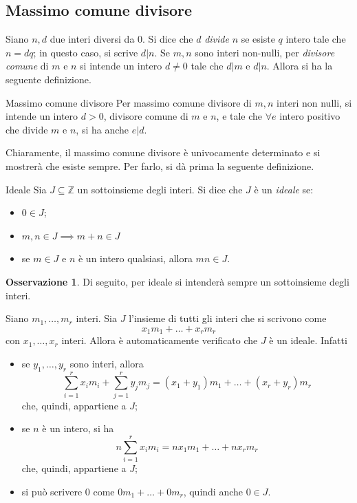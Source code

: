 \documentclass[11pt, a4paper]{scrartcl}
\theoremstyle{definition}
\numberwithin{esempio}{section}
\theoremstyle{definition}
\newtheorem{obs}{Osservazione}
\numberwithin{obs}{section}
\numberwithin{nota}{section}
\numberwithin{equation}{subsection}
\begin{document}
\subsection{Massimo comune divisore}
Siano $n, d$ due interi diversi da $0$.
Si dice che $d$ \textit{divide} $n$ se esiste $q$ intero tale che $n = dq$; in questo caso, si scrive $d|n$.
Se $m,n$ sono interi non-nulli, per \textit{divisore comune} di $m$ e $n$ si intende un intero $d\neq 0$ tale che $d | m$ e $d | n$. 
Allora si ha la seguente definizione.
\begin{definizione}
	{Massimo comune divisore}{}
	Per massimo comune divisore di $m,n$ interi non nulli, si intende un intero $d>0$, divisore comune di $m$ e $n$, e tale che $\forall e $ intero positivo che divide $m$ e $n$, si ha anche $e|d$.
\end{definizione}
\noindent Chiaramente, il massimo comune divisore \`e univocamente determinato e si mostrer\`a che esiste sempre. 
Per farlo, si d\`a prima la seguente definizione.
\begin{definizione}
	{Ideale}{}
	Sia $J\subseteq \mathbb{Z}$ un sottoinsieme degli interi. Si dice che $J$ \`e un \textit{ideale} se:
	\begin{itemize}
		\item $0 \in J$;
		\item $m,n\in J\implies m+n \in J$
		\item se $m\in J$ e $n$ \`e un intero qualsiasi, allora $mn \in J$.
	\end{itemize}
\end{definizione}
\begin{obs}
	Di seguito, per ideale si intender\`a sempre un sottoinsieme degli interi.
\end{obs}
\noindent Siano $m_1, \ldots,m_r$ interi. Sia $J$ l'insieme di tutti gli interi che si scrivono come
\[
x_1m_1+\ldots+x_r m_r
\] 
con $x_1,\ldots,x_r$ interi. 
Allora \`e automaticamente verificato che $J$ \`e un ideale. Infatti
\begin{itemize}
	\item se $y_1,\ldots,y_r$ sono interi, allora
		\[
		\sum_{i=1}^{r} x_i m_i +  \sum_{j=1}^{r} y_j m_j = (x_1 + y_1) m_1 + \ldots + (x_r + y_r) m_r
		\] 
		che, quindi, appartiene a $J$;
	\item se $n$ \`e un intero, si ha
		\[
		n \sum_{i=1}^{r} x_i m_i = nx_1m_1 + \ldots+ nx_r m_r
		\] 
		che, quindi, appartiene a $J$;
	\item si pu\`o scrivere $0$ come $0m_1 + \ldots + 0m_r$, quindi anche $0 \in J$.
\end{itemize}
\end{document}
